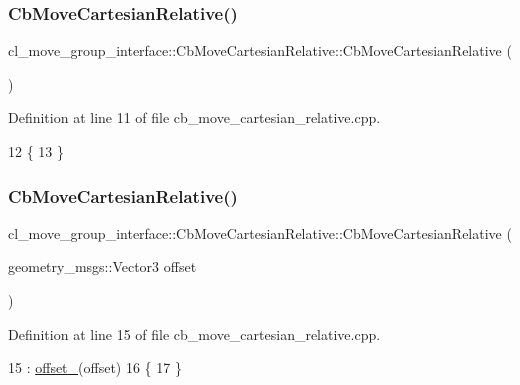 \subsubsection{\texorpdfstring{Cb\+Move\+Cartesian\+Relative()}{CbMoveCartesianRelative()}\hspace{0.1cm}{\footnotesize\ttfamily [1/2]}}
{\footnotesize\ttfamily cl\+\_\+move\+\_\+group\+\_\+interface\+::\+Cb\+Move\+Cartesian\+Relative\+::\+Cb\+Move\+Cartesian\+Relative (\begin{DoxyParamCaption}{ }\end{DoxyParamCaption})}



Definition at line 11 of file cb\+\_\+move\+\_\+cartesian\+\_\+relative.\+cpp.


\begin{DoxyCode}
12 \{
13 \}
\end{DoxyCode}
\mbox{\label{classcl__move__group__interface_1_1CbMoveCartesianRelative_a725ebdd1fdbc3c7a356e9c94cbc14259}} 
\subsubsection{\texorpdfstring{Cb\+Move\+Cartesian\+Relative()}{CbMoveCartesianRelative()}\hspace{0.1cm}{\footnotesize\ttfamily [2/2]}}
{\footnotesize\ttfamily cl\+\_\+move\+\_\+group\+\_\+interface\+::\+Cb\+Move\+Cartesian\+Relative\+::\+Cb\+Move\+Cartesian\+Relative (\begin{DoxyParamCaption}\item[{geometry\+\_\+msgs\+::\+Vector3}]{offset }\end{DoxyParamCaption})}



Definition at line 15 of file cb\+\_\+move\+\_\+cartesian\+\_\+relative.\+cpp.


\begin{DoxyCode}
15                                                                             : 
      \hyperlink{classcl__move__group__interface_1_1CbMoveCartesianRelative_aac5b6c2f42406da43f94cd5334aca925}{offset\_}(offset)
16 \{
17 \}
\end{DoxyCode}



